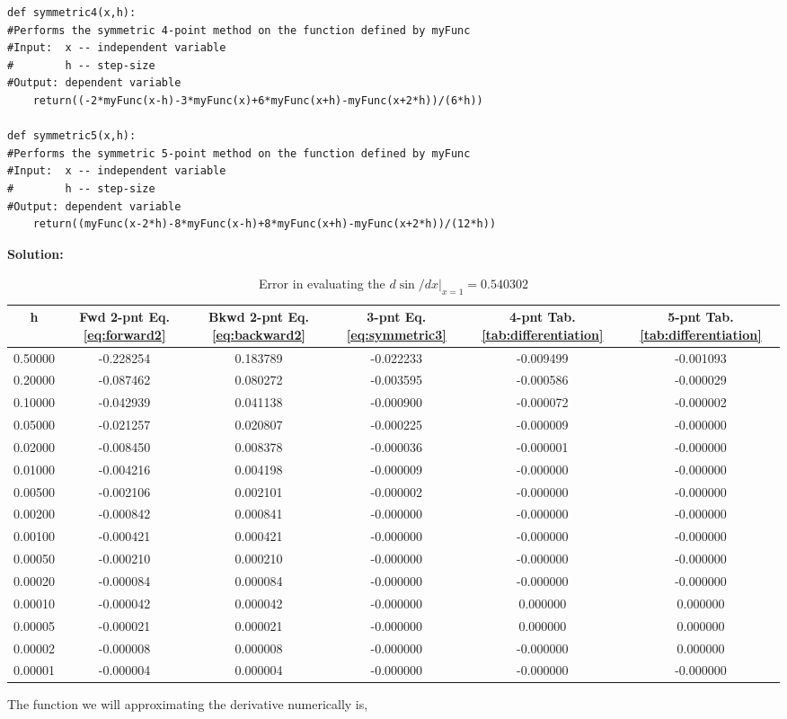 \documentclass[10pt]{article}
\begin{document}
\begin{lstlisting}
def symmetric4(x,h):
#Performs the symmetric 4-point method on the function defined by myFunc
#Input:  x -- independent variable
#        h -- step-size
#Output: dependent variable
    return((-2*myFunc(x-h)-3*myFunc(x)+6*myFunc(x+h)-myFunc(x+2*h))/(6*h))

def symmetric5(x,h):
#Performs the symmetric 5-point method on the function defined by myFunc
#Input:  x -- independent variable
#        h -- step-size
#Output: dependent variable
    return((myFunc(x-2*h)-8*myFunc(x-h)+8*myFunc(x+h)-myFunc(x+2*h))/(12*h))
\end{lstlisting}
\label{solution:1.1}\textbf{Solution:}
\begin{table}[!ht]
	\begin{center}
	\caption{Error in evaluating the $d \sin /dx|_{x=1}=0.540302$}
		\label{tab:diff_errors}
		\begin{tabular}{|cccccc|}
		\hline
		h & Fwd 2-pnt Eq. \ref{eq:forward2} & Bkwd 2-pnt Eq. \ref{eq:backward2} & 3-pnt Eq. \ref{eq:symmetric3} & 4-pnt Tab. \ref{tab:differentiation} & 5-pnt Tab. \ref{tab:differentiation} \\
		\hline
		0.50000&-0.228254&0.183789&-0.022233&-0.009499&-0.001093\\
		0.20000&-0.087462&0.080272&-0.003595&-0.000586&-0.000029\\
		0.10000&-0.042939&0.041138&-0.000900&-0.000072&-0.000002\\
		0.05000&-0.021257&0.020807&-0.000225&-0.000009&-0.000000\\
		0.02000&-0.008450&0.008378&-0.000036&-0.000001&-0.000000\\
		0.01000&-0.004216&0.004198&-0.000009&-0.000000&-0.000000\\
		0.00500&-0.002106&0.002101&-0.000002&-0.000000&-0.000000\\
		0.00200&-0.000842&0.000841&-0.000000&-0.000000&-0.000000\\
		0.00100&-0.000421&0.000421&-0.000000&-0.000000&-0.000000\\
		0.00050&-0.000210&0.000210&-0.000000&-0.000000&-0.000000\\
		0.00020&-0.000084&0.000084&-0.000000&-0.000000&-0.000000\\
		0.00010&-0.000042&0.000042&-0.000000&0.000000&0.000000\\
		0.00005&-0.000021&0.000021&-0.000000&0.000000&0.000000\\
		0.00002&-0.000008&0.000008&-0.000000&-0.000000&0.000000\\
		0.00001&-0.000004&0.000004&-0.000000&-0.000000&-0.000000\\
		\hline
		\end{tabular}
	\end{center}
\end{table}
The function we will approximating the derivative numerically is,
\end{document}
